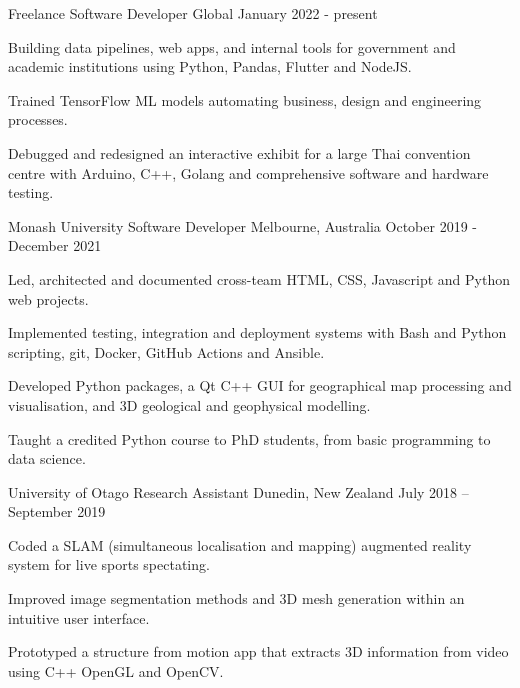 


\begin{cventries}
  \cventry
    {Freelance} %
	{Software Developer} %
    {Global} %
    {January 2022 - present} %
    {
      \begin{cvitems} %
		  \item {
			Building data pipelines, web apps, and internal tools for government and academic institutions using Python, Pandas, Flutter and NodeJS.
			  }
		  \item {
			Trained TensorFlow ML models automating business, design and engineering processes. 
			  }
		  \item {
			Debugged and redesigned an interactive exhibit for a large Thai convention centre with Arduino, C++, Golang and comprehensive software and hardware testing.
			  }
      \end{cvitems}
    }


  \cventry
    {Monash University} %
    {Software Developer} %
    {Melbourne, Australia} %
    {October 2019 - December 2021} %
    {
      \begin{cvitems} %
		  \item {
			 Led, architected and documented cross-team HTML, CSS, Javascript and Python web projects. 
			  }
		  \item {
			 Implemented testing, integration and deployment systems with Bash and Python scripting, git, Docker, GitHub Actions and Ansible. 
			  } 
		  \item {
			 Developed Python packages, a Qt C++ GUI for geographical map processing and visualisation, and 3D geological and geophysical modelling. 
			  }
		  \item {
			 Taught a credited Python course to PhD students, from basic programming to data science.
			  }
      \end{cvitems}
    }


  \cventry
    {University of Otago} %
    {Research Assistant} %
    {Dunedin, New Zealand} %
    {July 2018 – September 2019} %
    {
      \begin{cvitems} %
        \item {
			 Coded a SLAM (simultaneous localisation and mapping) augmented reality system for live sports spectating. 
		}
        \item {
			 Improved image segmentation methods and 3D mesh generation within an intuitive user interface. 
		}
        \item {
			 Prototyped a structure from motion app that extracts 3D information from video using C++ OpenGL and OpenCV.
		}
      \end{cvitems}
    }



\end{cventries}
